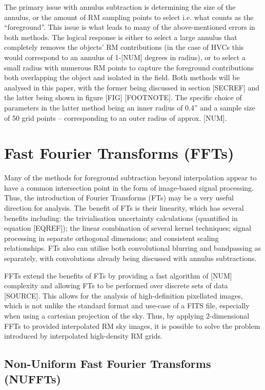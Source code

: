 The primary issue with annulus subtraction is determining the size of the annulus, or the amount of RM sampling points to select i.e. what counts as the “foreground”. This issue is what leads to many of the above-mentioned errors in both methods. The logical response is either to select a large annulus that completely removes the objects' RM contributions (in the case of HVCs this would correspond to an annulus of 1-[NUM] degrees in radius), or to select a small radius with numerous RM points to capture the foreground contributions both overlapping the object and isolated in the field. Both methods will be analysed in this paper, with the former being discussed in section [SECREF] and the latter being shown in figure [FIG] [FOOTNOTE]. The specific choice of parameters in the latter method being an inner radius of 0.4” and a sample size of 50 grid points – corresponding to an outer radius of approx. [NUM].

\section{Fast Fourier Transforms (FFTs)}
\label{sec:ffts}

Many of the methods for foreground subtraction beyond interpolation appear to have a common intersection point in the form of image-based signal processing. Thus, the introduction of Fourier Transforms (FTs) may be a very useful direction for analysis. The benefit of FTs is their linearity, which has several benefits including: the trivialisation uncertainty calculations (quantified in equation [EQREF]); the linear combination of several kernel techniques; signal processing in separate orthogonal dimensions; and consistent scaling relationships. FTs also can utilise both convolutional blurring and bandpassing as separately, with convolutions already being discussed with annulus subtractions.


FFTs extend the benefits of FTs by providing a fast algorithm of [NUM] complexity and allowing FTs to be performed over discrete sets of data [SOURCE]. This allows for the analysis of high-definition pixellated images, which is not unlike the standard format and use-case of a FITS file, especially when using a cartesian projection of the sky. Thus, by applying 2-dimensional FFTs to provided interpolated RM sky images, it is possible to solve the problem introduced by interpolated high-density RM grids.

\subsection{Non-Uniform Fast Fourier Transforms (NUFFTs)}
\label{ssec:nuffts}

